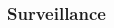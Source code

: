 \documentclass[main]{subfiles}
\begin{document}
\begin{frame}[t]\frametitle{Surveillance}
\vspace{1em}
\begin{columns}
\begin{column}{0.3\textwidth}



\end{column}
\begin{column}{0.33\textwidth}


\end{column}
\end{columns}
\end{frame}
\end{document}

